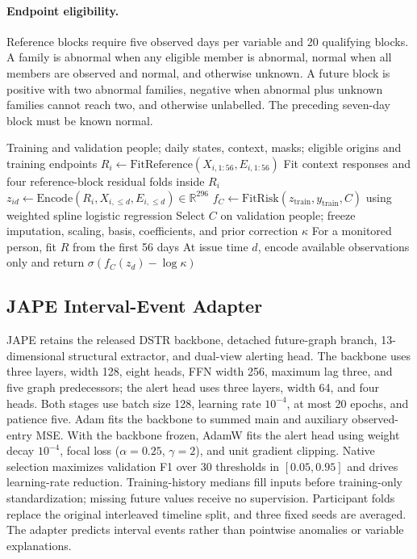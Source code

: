 \paragraph{Endpoint eligibility.}
Reference blocks require five observed days per variable and 20 qualifying blocks. A family is abnormal when any eligible member is abnormal, normal when all members are observed and normal, and otherwise unknown. A future block is positive with two abnormal families, negative when abnormal plus unknown families cannot reach two, and otherwise unlabelled. The preceding seven-day block must be known normal.

\begin{algorithm}[!tb]
\caption{Fit HNE and issue a prospective score}
\label{alg:hne}
\begin{algorithmic}[1]
\REQUIRE Training and validation people; daily states, context, masks; eligible origins and training endpoints
  \STATE $R_i\leftarrow\mathrm{FitReference}(X_{i,1:56},E_{i,1:56})$
  \STATE Fit context responses and four reference-block residual folds inside $R_i$
    \STATE $z_{id}\leftarrow\mathrm{Encode}(R_i,X_{i,\leq d},E_{i,\leq d})\in\mathbb{R}^{296}$
  \ENDFOR
\ENDFOR
{}
  \STATE $f_C\leftarrow\mathrm{FitRisk}(z_{\mathrm{train}},y_{\mathrm{train}},C)$ using weighted spline logistic regression
\ENDFOR
\STATE Select $C$ on validation people; freeze imputation, scaling, basis, coefficients, and prior correction $\kappa$
\STATE For a monitored person, fit $R$ from the first 56 days
\STATE At issue time $d$, encode available observations only and return $\sigma(f_C(z_d)-\log\kappa)$
\end{algorithmic}
\end{algorithm}

\subsection{JAPE Interval-Event Adapter}
JAPE retains the released DSTR backbone, detached future-graph branch, 13-dimensional structural extractor, and dual-view alerting head. The backbone uses three layers, width 128, eight heads, FFN width 256, maximum lag three, and five graph predecessors; the alert head uses three layers, width 64, and four heads. Both stages use batch size 128, learning rate $10^{-4}$, at most 20 epochs, and patience five. Adam fits the backbone to summed main and auxiliary observed-entry MSE. With the backbone frozen, AdamW fits the alert head using weight decay $10^{-4}$, focal loss ($\alpha=0.25$, $\gamma=2$), and unit gradient clipping. Native selection maximizes validation F1 over 30 thresholds in $[0.05,0.95]$ and drives learning-rate reduction. Training-history medians fill inputs before training-only standardization; missing future values receive no supervision. Participant folds replace the original interleaved timeline split, and three fixed seeds are averaged. The adapter predicts interval events rather than pointwise anomalies or variable explanations.

